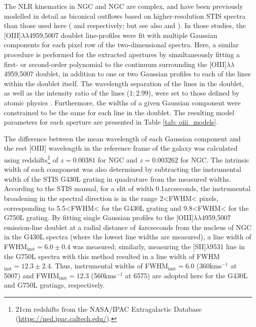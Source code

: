 The NLR kinematics in NGC and NGC are complex, and have been previously modelled in detail as biconical outflows based on higher-resolution STIS spectra than those used here (\citealt{Das2006} and \citealt{Das2005} respectively; but see also \citealt{Crenshaw2000_N1068} and \citealt{Crenshaw2000_N4151}). In those studies, the [OIII]$\lambda\lambda$4959,5007 doublet line-profiles were fit with multiple Gaussian components for each pixel row of the two-dimensional spectra. Here, a similar procedure is performed for the extracted apertures by simultaneously fitting a first- or second-order polynomial to the continuum surrounding the [OIII]$\lambda\lambda$4959,5007 doublet, in addition to one or two Gaussian profiles to each of the lines within the doublet itself. The wavelength separation of the lines in the doublet, as well as the intensity ratio of the lines ($1:2.99$), were set to those defined by atomic physics \citep{Osterbrock2006}. Furthermore, the widths of a given Gaussian component were constrained to be the same for each line in the doublet. The resulting model parameters for each aperture are presented in Table \ref{tab: oiii_models}.

The difference between the mean wavelength of each Gaussian component and the rest [OIII] wavelength in the reference frame of the galaxy was calculated using redshifts\footnote{21\;cm redshifts from the NASA/IPAC Extragalactic Database (\url{https://ned.ipac.caltech.edu/}).} of $z=0.00381$ for NGC and $z=0.003262$ for NGC. The intrinsic width of each component was also determined by subtracting the instrumental width of the STIS G430L grating in quadrature from the measured widths. According to the STIS manual, for a slit of width 0.1\;arcseconds, the instrumental broadening in the spectral direction is in the range \mbox{2\;\textless\;FWHM\;\textless{}} pixels, corresponding to \mbox{5.5\;\textless\;FWHM\;\textless{}\;{\AA}} for the G430L grating and \mbox{9.8\;\textless\;FWHM\;\textless{}\;{\AA}} for the G750L grating. By fitting single Gaussian profiles to the [OIII]$\lambda\lambda$4959,5007 emission-line doublet at a radial distance of 4\;arcseconds from the nucleus of NGC in the G430L spectra (where the lowest line widths are measured), a line width of FWHM$_\mathrm{inst}=6.0\pm0.4$\;{\AA} was measured; similarly, measuring the [SII]$\lambda$9531 line in the G750L spectra with this method resulted in a line width of FWHM$_\mathrm{inst}=12.3\pm2.4$\;{\AA}. Thus, instrumental widths of FWHM$_\mathrm{inst}=6.0$\;{\AA} (360\;km\;s$^{-1}$ at 5007\;{\AA}) and FWHM$_\mathrm{inst}=12.3$\;{\AA} (560\;km\;s$^{-1}$ at 6575\;{\AA}) are adopted here for the G430L and G750L gratings, respectively.

